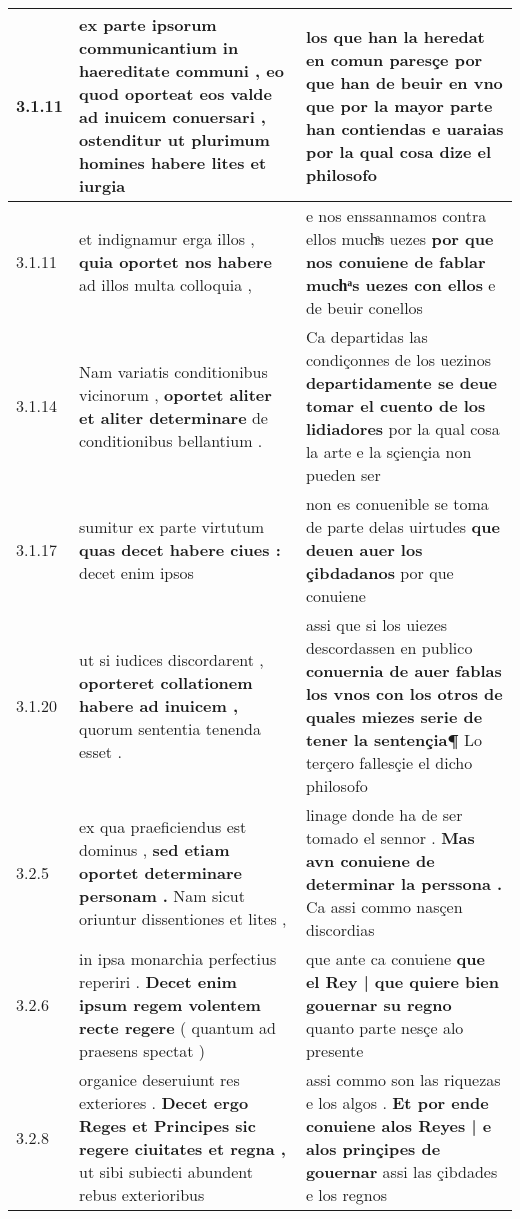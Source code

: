 \begin{tabular}{|p{1cm}|p{6.5cm}|p{6.5cm}|}
3.1.11 & ex parte ipsorum communicantium in haereditate communi , \textbf{ eo quod oporteat eos valde ad inuicem conuersari , } ostenditur ut plurimum homines habere lites et iurgia & los que han la heredat en comun paresçe \textbf{ por que han de beuir en vno } que por la mayor parte han contiendas e uaraias por la qual cosa dize el philosofo \\\hline
3.1.11 & et indignamur erga illos , \textbf{ quia oportet nos habere } ad illos multa colloquia , & e nos enssannamos contra ellos muchͣs uezes \textbf{ por que nos conuiene de fablar muchͣs uezes con ellos } e de beuir conellos \\\hline
3.1.14 & Nam variatis conditionibus vicinorum , \textbf{ oportet aliter et aliter determinare } de conditionibus bellantium . & Ca departidas las condiçonnes de los uezinos \textbf{ departidamente se deue tomar el cuento de los lidiadores } por la qual cosa la arte e la sçiençia non pueden ser \\\hline
3.1.17 & sumitur ex parte virtutum \textbf{ quas decet habere ciues : } decet enim ipsos & non es conuenible se toma de parte delas uirtudes \textbf{ que deuen auer los çibdadanos } por que conuiene \\\hline
3.1.20 & ut si iudices discordarent , \textbf{ oporteret collationem habere ad inuicem , } quorum sententia tenenda esset . & assi que si los uiezes descordassen en publico \textbf{ conuernia de auer fablas los vnos con los otros de quales miezes serie de tener la sentençia¶ } Lo terçero fallesçie el dicho philosofo \\\hline
3.2.5 & ex qua praeficiendus est dominus , \textbf{ sed etiam oportet determinare personam . } Nam sicut oriuntur dissentiones et lites , & linage donde ha de ser tomado el sennor . \textbf{ Mas avn conuiene de determinar la perssona . } Ca assi commo nasçen discordias \\\hline
3.2.6 & in ipsa monarchia perfectius reperiri . \textbf{ Decet enim ipsum regem volentem recte regere } ( quantum ad praesens spectat ) & que ante ca conuiene \textbf{ que el Rey | que quiere bien gouernar su regno } quanto parte nesçe alo presente \\\hline
3.2.8 & organice deseruiunt res exteriores . \textbf{ Decet ergo Reges et Principes sic regere ciuitates et regna , } ut sibi subiecti abundent rebus exterioribus & assi commo son las riquezas e los algos . \textbf{ Et por ende conuiene alos Reyes | e alos prinçipes de gouernar } assi las çibdades e los regnos \\\hline

\end{tabular}
